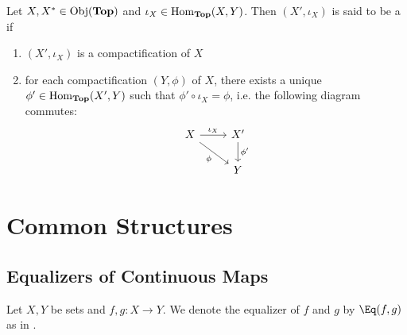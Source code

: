 \documentclass{book}
\begin{document}
	\begin{defn}
		Let $X, X^* \in \operatorname{Obj}(\operatorname*{\text{\textbf{Top}}})$ and $\iota_X \in \operatorname{Hom}_{\operatorname*{\text{\textbf{Top}}}}(X, Y)$. Then $(X', \iota_X)$ is said to be a  if 
		\begin{enumerate}
			\item $(X', \iota_X)$ is a compactification of $X$
			\item for each compactification $(Y, \phi)$ of $X$, there exists a unique $\phi' \in \operatorname{Hom}_{\operatorname*{\text{\textbf{Top}}}}(X', Y)$ such that $\phi' \circ \iota_X = \phi$, i.e. the following diagram commutes:
			\[ \begin{tikzcd}
				X \arrow[r, "\iota_X"] \arrow[dr, "\phi"'] & X' \arrow[d, "\phi'"]  \\
				                                           & Y
			\end{tikzcd}
			\]
		\end{enumerate}
	\end{defn}





























	













\newpage
\section{Common Structures}


\subsection{Equalizers of Continuous Maps}

\begin{note}
	Let $X, Y$ be sets and $f,g:X \rightarrow Y$. We denote the equalizer of $f$ and $g$ by $\Eq(f,g)$ as in .
\end{note}
\end{document}
